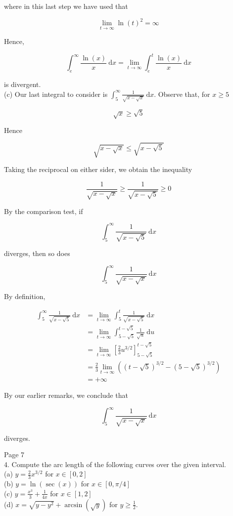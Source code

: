 \documentclass[10pt]{article}
\begin{document}
where in this last step we have used that

$$
\lim _{t \rightarrow \infty} \ln (t)^{2}=\infty
$$

Hence,

$$
\int_{e}^{\infty} \frac{\ln (x)}{x} \mathrm{~d} x=\lim _{t \rightarrow \infty} \int_{e}^{t} \frac{\ln (x)}{x} \mathrm{~d} x
$$

is divergent.\\
(c) Our last integral to consider is $\int_{5}^{\infty} \frac{1}{\sqrt{x-\sqrt{x}}} \mathrm{~d} x$. Observe that, for $x \geq 5$

$$
\sqrt{x} \geq \sqrt{5}
$$

Hence

$$
\sqrt{x-\sqrt{x}} \leq \sqrt{x-\sqrt{5}}
$$

Taking the reciprocal on either sider, we obtain the inequality

$$
\frac{1}{\sqrt{x-\sqrt{x}}} \geq \frac{1}{\sqrt{x-\sqrt{5}}} \geq 0
$$

By the comparison test, if

$$
\int_{5}^{\infty} \frac{1}{\sqrt{x-\sqrt{5}}} \mathrm{~d} x
$$

diverges, then so does

$$
\int_{5}^{\infty} \frac{1}{\sqrt{x-\sqrt{x}}} \mathrm{~d} x
$$

By definition,

$$
\begin{aligned}
\int_{5}^{\infty} \frac{1}{\sqrt{x-\sqrt{5}}} \mathrm{~d} x & =\lim _{t \rightarrow \infty} \int_{5}^{t} \frac{1}{\sqrt{x-\sqrt{5}}} \mathrm{~d} x \\
& =\lim _{t \rightarrow \infty} \int_{5-\sqrt{5}}^{t-\sqrt{5}} \frac{1}{\sqrt{u}} \mathrm{~d} u \\
& =\lim _{t \rightarrow \infty}\left[\frac{2}{3} u^{3 / 2}\right]_{5-\sqrt{5}}^{t-\sqrt{5}} \\
& =\frac{2}{3} \lim _{t \rightarrow \infty}\left((t-\sqrt{5})^{3 / 2}-(5-\sqrt{5})^{3 / 2}\right) \\
& =+\infty
\end{aligned}
$$

By our earlier remarks, we conclude that

$$
\int_{5}^{\infty} \frac{1}{\sqrt{x-\sqrt{x}}} \mathrm{~d} x
$$

diverges.

Page 7\\
4. Compute the arc length of the following curves over the given interval.\\
(a) $y=\frac{2}{3} x^{3 / 2}$ for $x \in[0,2]$\\
(b) $y=\ln (\sec (x))$ for $x \in[0, \pi / 4]$\\
(c) $y=\frac{x^{3}}{3}+\frac{1}{4 x}$ for $x \in[1,2]$\\
(d) $x=\sqrt{y-y^{2}}+\arcsin (\sqrt{y})$ for $y \geq \frac{1}{2}$.
\end{document}
